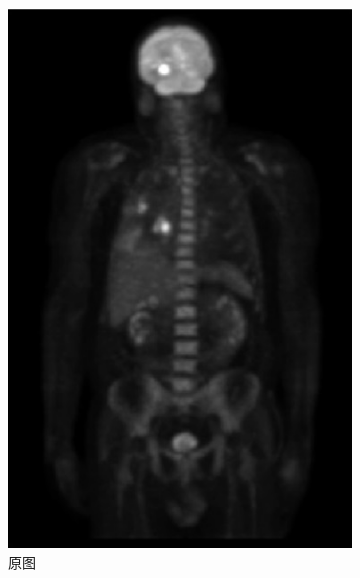 \documentclass[a4paper]{ctexart}
\newcommand{\outwthree}{0.3\textwidth}
\begin{document}
\begin{spacing}{1.35}
\begin{figure}[htbp]
\begin{subfigure}[t]{\outwthree}
			\includegraphics[width=\textwidth]{figure/image2.jpg}
			\caption{原图}
		\end{subfigure}
		\begin{subfigure}[t]{\outwthree}
			\centering

\end{subfigure}
\end{figure}
\end{spacing}
\end{document}
